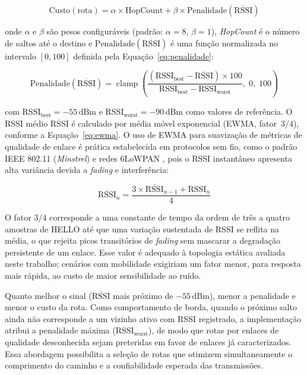 \begin{equation}\label{eq:custo}
  \text{Custo}(\text{rota}) = \alpha \times \text{HopCount} + \beta \times \text{Penalidade}(\overline{\text{RSSI}})
\end{equation}

\noindent onde $\alpha$ e $\beta$ são pesos configuráveis (padrão: $\alpha = 8$, $\beta = 1$),
\emph{HopCount} é o número de saltos até o destino e
$\text{Penalidade}(\overline{\text{RSSI}})$ é uma função normalizada
no intervalo $[0, 100]$ definida pela Equação~\ref{eq:penalidade}:

\begin{equation}\label{eq:penalidade}
  \text{Penalidade}(\overline{\text{RSSI}}) =
  \operatorname{clamp}\!\left(
    \frac{(\text{RSSI}_\text{best} - \overline{\text{RSSI}}) \times 100}
         {\text{RSSI}_\text{best} - \text{RSSI}_\text{worst}},\;0,\;100
  \right)
\end{equation}

\noindent com $\text{RSSI}_\text{best} = -55\,\text{dBm}$ e
$\text{RSSI}_\text{worst} = -90\,\text{dBm}$ como valores de referência.
O RSSI médio $\overline{\text{RSSI}}$ é calculado por média móvel
exponencial (EWMA, fator~$3/4$), conforme a Equação~\ref{eq:ewma}.
O uso de EWMA para suavização de métricas de qualidade de enlace é
prática estabelecida em protocolos sem fio, como o padrão IEEE 802.11
(\emph{Minstrel}) e redes 6LoWPAN \cite{rfc6551}, pois o RSSI
instantâneo apresenta alta variância devida a \emph{fading} e
interferência:

\begin{equation}\label{eq:ewma}
  \overline{\text{RSSI}}_n = \frac{3 \times \overline{\text{RSSI}}_{n-1} + \text{RSSI}_n}{4}
\end{equation}

\noindent O fator $3/4$ corresponde a uma constante de tempo da ordem de
três a quatro amostras de HELLO até que uma variação sustentada de RSSI se
reflita na média, o que rejeita picos transitórios de \emph{fading} sem
mascarar a degradação persistente de um enlace. Esse valor é adequado à
topologia estática avaliada neste trabalho; cenários com mobilidade
exigiriam um fator menor, para resposta mais rápida, ao custo de maior
sensibilidade ao ruído.

\noindent Quanto melhor o sinal ($\overline{\text{RSSI}}$ mais próximo de $-55\,\text{dBm}$),
menor a penalidade e menor o custo da rota. Como comportamento de borda,
quando o próximo salto ainda não corresponde a um vizinho ativo com
RSSI registrado, a implementação atribui a penalidade máxima
($\text{RSSI}_\text{worst}$), de modo que rotas por enlaces de qualidade
desconhecida sejam preteridas em favor de enlaces já caracterizados.
Essa abordagem possibilita a seleção de rotas que otimizem
simultaneamente o comprimento do caminho e a confiabilidade esperada das
transmissões.

